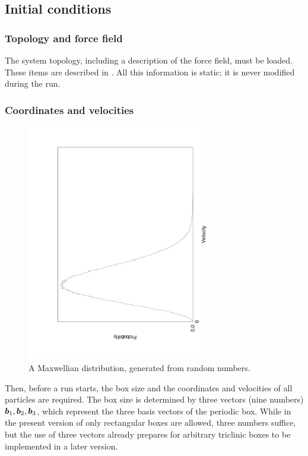\subsection{Initial conditions}
\subsubsection{Topology and force field}
The system topology, including a description of the force field, must
be loaded. These items are described in .
All this information is static; it is never modified during the run.

\subsubsection{Coordinates and velocities}
\begin{figure}
\centerline{\includegraphics[width=8cm,angle=270]{plots/maxwell}}
\caption{A Maxwellian distribution, generated from random numbers.}
\label{fig:maxwell}
\end{figure}

Then, before a run starts, the box size and the coordinates and
velocities of  all particles are required. The box size is determined
by three vectors (nine numbers) $\mbox{\boldmath ${b}$}_1, \mbox{\boldmath ${b}$}_2, \mbox{\boldmath ${b}$}_3$, which
represent the three basis vectors of the periodic box. While in the
present version of {\gromacs} only rectangular boxes are allowed, three
numbers  suffice, but the use of three vectors already
prepares for arbitrary triclinic boxes to be implemented in a later
version. 

